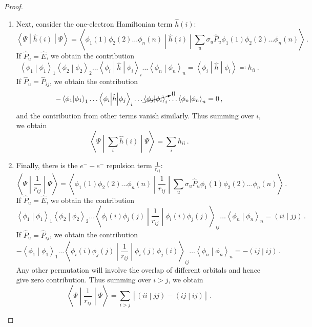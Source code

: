 \documentclass{article}
\theoremstyle{plain}\theoremheaderfont{\normalfont\itshape}\theorembodyfont{\rmfamily}\theoremseparator{.}\newtheorem*{rem}{Remark}\newtheorem*{ex}{Example}\newtheorem*{proof}{Proof}\newtheorem*{altp}{Alternative proof}
\theoremstyle{plain}\theoremheaderfont{\normalfont\bfseries}\theorembodyfont{\rmfamily}\theoremseparator{.}\newtheorem{thm}{Theorem}[section]\newtheorem{lem}[thm]{Lemma}\newtheorem{prop}[thm]{Proposition}\newtheorem*{cor}{Corollary}\newtheorem{defn}[thm]{Definition}\newtheorem{clm}[thm]{Claim}\newtheorem{clminproof}{Claim}
\theoremstyle{break}\theoremheaderfont{\normalfont\itshape}\theorembodyfont{\rmfamily}\theoremseparator{.\medskip}\newtheorem*{proofskip}{Proof}\newtheorem*{exs}{Examples}\newtheorem*{rems}{Remarks}
\theoremstyle{break}\theoremheaderfont{\normalfont\bfseries}\theorembodyfont{\rmfamily}\theoremseparator{.\medskip}\newtheorem{lemskip}[thm]{Lemma}\newtheorem{defnskip}[thm]{Definition}\newtheorem{propskip}[thm]{Proposition}\newtheorem{thmskip}[thm]{Theorem}
\numberwithin{equation}{section}
\newcommand{\braket}[2]{\left\langle #1 \middle| #2 \right\rangle}
\newcommand{\mel}[3]{\left\langle #1 \middle| #2 \middle| #3 \right\rangle}
\newcommand{\expval}[2]{\left\langle #2 \middle| #1 \middle| #2 \right\rangle}
\newcommand{\bracket}[2]{\left( #1 \middle| #2 \right)}
\begin{document}
\begin{proof}
\begin{enumerate}[topsep=0pt,label=(\roman*)]
            \item Next, consider the one-electron Hamiltonian term \(\hat{h}(i)\):
            \begin{equation}
                \expval{\hat{h}(i)}{\Psi}=\mel{\phi_1(1)\phi_2(2)\dots\phi_n(n)}{\hat{h}(i)}{\sum_u\sigma_u\hat{P}_u\phi_1(1)\phi_2(2)\dots\phi_n(n)}\,.
            \end{equation}
            If \(\hat{P}_u=\hat{E}\), we obtain the contribution
            \begin{equation}
                \braket{\phi_1}{\phi_1}_1\braket{\phi_2}{\phi_2}_2\dots\expval{\hat{h}}{\phi_i}_i\dots\braket{\phi_n}{\phi_n}_n=\expval{\hat{h}}{\phi_i}\eqqcolon h_{ii}\,.
            \end{equation}
            If \(\hat{P}_u=\hat{P}_{ij}\), we obtain the contribution
            \begin{equation}
                -\braket{\phi_1}{\phi_1}_1\dots\mel{\phi_i}{\hat{h}}{\phi_j}_i\dots\cancelto{0}{\braket{\phi_j}{\phi_i}_i}\dots\braket{\phi_n}{\phi_n}_n=0\,,
            \end{equation}
            and the contribution from other terms vanish similarly. Thus summing over \(i\), we obtain
            \begin{equation}
                \expval{\sum_i\hat{h}(i)}{\Psi}=\sum_i h_{ii}\,.
            \end{equation}
            \item Finally, there is the \(e^- - e^-\) repulsion term \(\frac{1}{r_{ij}}\):
            \begin{equation}
                \expval{\frac{1}{r_{ij}}}{\Psi}=\mel{\phi_1(1)\phi_2(2)\dots\phi_n(n)}{\frac{1}{r_{ij}}}{\sum_u\sigma_u\hat{P}_u\phi_1(1)\phi_2(2)\dots\phi_n(n)}\,.
            \end{equation}
            If \(\hat{P}_u=\hat{E}\), we obtain the contribution
            \begin{equation}
                \braket{\phi_1}{\phi_1}_1\braket{\phi_2}{\phi_2}_2\dots\expval{\frac{1}{r_{ij}}}{\phi_i(i)\phi_j(j)}_{ij}\dots\braket{\phi_n}{\phi_n}_n=\bracket{ii}{jj}\,.
            \end{equation}
            If \(\hat{P}_u=\hat{P}_{ij}\), we obtain the contribution
            \begin{equation}
                -\braket{\phi_1}{\phi_1}_1\dots\mel{\phi_i(i)\phi_j(j)}{\frac{1}{r_{ij}}}{\phi_i(j)\phi_j(i)}_{ij}\dots\braket{\phi_n}{\phi_n}_n=-\bracket{ij}{ij}\,.
            \end{equation}
            Any other permutation will involve the overlap of different orbitals and hence give zero contribution. Thus summing over \(i>j\), we obtain
            \begin{equation}
                \expval{\frac{1}{r_{ij}}}{\Psi}=\sum_{i>j}[\bracket{ii}{jj}-\bracket{ij}{ij}]\,.
            \end{equation}
        \end{enumerate}


\end{proof}
\end{document}
